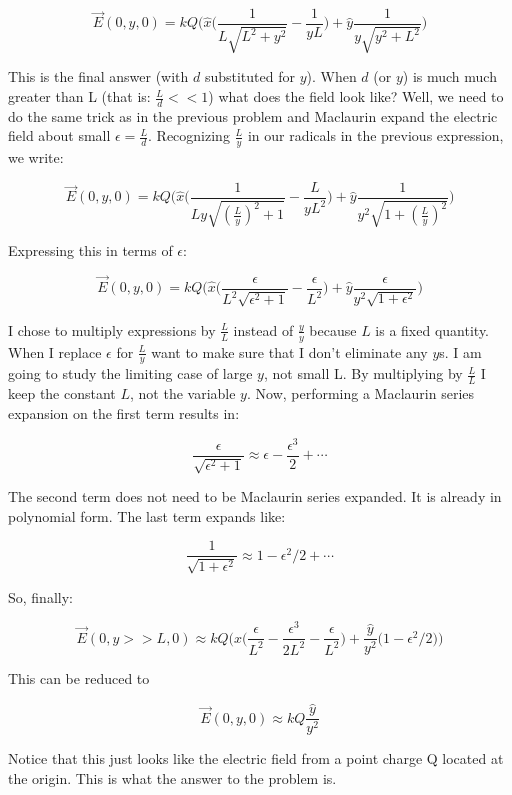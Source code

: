 \begin{homeworkProblem}[Problem 23.42]
\[ \vec{E}(0,y,0) = k Q \bigg( \hat{x} \big( \frac{1}{L \sqrt{L^2+ y^2}}
- \frac{1}{y L} \big) + \hat{y} \frac{1}{y\sqrt{y^2+L^2}} \bigg) \]

This is the final answer (with $d$ substituted for $y$). When $d$ (or
$y$) is much much greater than L (that is: $\frac{L}{d} << 1$) what does
the field look like? Well, we need to do the same trick as in the
previous problem and Maclaurin expand the electric field about small
$\epsilon = \frac{L}{d}$. Recognizing $\frac{L}{y}$ in our radicals in
the previous expression, we write:

\[ \vec{E}(0,y,0) = k Q \bigg( \hat{x} \big( \frac{1}{L
y\sqrt{(\frac{L}{y})^2+ 1}} - \frac{L}{y L^2} \big) + \hat{y}
\frac{1}{y^2 \sqrt{1+(\frac{L}{y})^2}} \bigg) \]

Expressing this in terms of $\epsilon$:

\[ \vec{E}(0,y,0) = k Q \bigg( \hat{x} \big( \frac{\epsilon}{L^2
\sqrt{\epsilon^2+ 1}} - \frac{\epsilon}{L^2} \big) + \hat{y}
\frac{\epsilon}{y^2 \sqrt{1+\epsilon^2}} \bigg) \]

I chose to multiply expressions by $ \frac{L}{L}$ instead of
$\frac{y}{y}$ because $L$ is a fixed quantity. When I replace $\epsilon$
for $\frac{L}{y}$ want to make sure that I don't eliminate any $y$s. I
am going to study the limiting case of large $y$, not small L. By
multiplying by $\frac{L}{L}$ I keep the constant $L$, not the variable
$y$. Now, performing a Maclaurin series expansion on the first term
results in:

\[ \frac{\epsilon}{\sqrt{\epsilon^2+1}} \approx \epsilon -
\frac{\epsilon^3}{2} + \cdots \]

The second term does not need to be Maclaurin series expanded. It is
already in polynomial form. The last term expands like:

\[ \frac{1}{\sqrt{1+\epsilon^2}} \approx 1 - \epsilon^2/2 + \cdots \]

So, finally:

\[ \vec{E}(0,y>>L,0) \approx k Q \bigg( \hat{x} \big(
\frac{\epsilon}{L^2} -\frac{\epsilon^3}{2 L^2} - \frac{\epsilon}{L^2}
\big) + \frac{\hat{y}}{y^2} \big( 1 - \epsilon^2/2 \big) \bigg) \]

This can be reduced to 

\[ \vec{E}(0,y,0) \approx k Q  \frac{\hat{y}}{y^2} \]

Notice that this just looks like the electric field from a point charge
Q located at the origin. This is what the answer to the problem is. 


\end{homeworkProblem}
